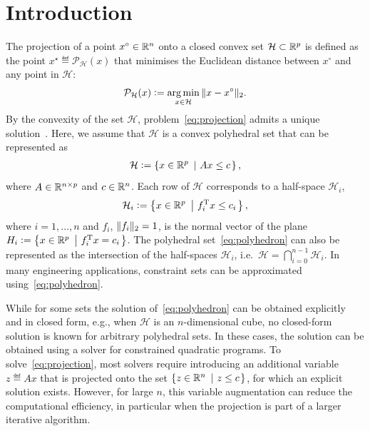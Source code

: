 \documentclass[hidelinks]{article}
\begin{document}
\newpage

\maketitle
\section{Introduction}

The projection of a point $x^\circ\in\mathbb{R}^n$ onto a closed convex set $\mathcal{H}\subset \mathbb{R}^p$ is defined as the point $x^\star\eqdef \mathcal{P}_{\mathcal{H}}(x)$ that minimises the Euclidean distance between $x^\circ$ and any point in $\mathcal{H}$:
\begin{align}\label{eq:projection}
\mathcal{P}_{\mathcal{H}}(x)\vcentcolon= \operatorname*{arg\,min}_{x\in\mathcal{H}}\Vert x-x^\circ \Vert_2.
\end{align}
By the convexity of the set $\mathcal{H}$, problem~\eqref{eq:projection} admits a unique solution~\cite[Ch.\ 3.2]{BAUSCHKEBOOK}. Here, we assume that $\mathcal{H}$ is a convex polyhedral set that can be represented as
\begin{align}\label{eq:polyhedron}
\mathcal{H}\vcentcolon=\left\{ x\in\mathbb{R}^p\ \left| \ A x \leq c \right. \right\},
\end{align}
where $A \in \mathbb{R}^{{n}\times{p}}$ and $c\in\mathbb{R}^n$. Each row of $\mathcal{H}$ corresponds to a half-space $\mathcal{H}_i$,
\begin{align}\label{eq:sets_i}
\mathcal{H}_i\vcentcolon=\left\{ x\in\mathbb{R}^p\ \left| \ f_i^{\text{T}}x \leq c_i \right. \right\},
\end{align}
where $i=1,\dots,n$ and $f_i$, $\Vert f_i \Vert_2=1$, is the normal vector of the plane $H_i\vcentcolon=\left\{ x\in\mathbb{R}^p\ \left| \ f_i^{\text{T}}x = c_i \right. \right\}$. The polyhedral set~\eqref{eq:polyhedron} can also be represented as the intersection of the half-spaces $\mathcal{H}_i$, i.e.\ $\mathcal{H}=\bigcap_{i=0}^{n-1}\mathcal{H}_i$. In many engineering applications, constraint sets can be approximated using~\eqref{eq:polyhedron}.

While for some sets the solution of~\eqref{eq:polyhedron} can be obtained explicitly and in closed form, e.g., when $\mathcal{H}$ is an $n$-dimensional cube, no closed-form solution is known for arbitrary polyhedral sets. In these cases, the solution can be obtained using a solver for constrained quadratic programs. To solve~\eqref{eq:projection}, most solvers require introducing an additional variable $z\eqdef Ax$ that is projected onto the set $\left\{ z\in\mathbb{R}^n\ \left| \ z \leq c \right. \right\}$, for which an explicit solution exists. However, for large $n$, this variable augmentation can reduce the computational efficiency, in particular when the projection is part of a larger iterative algorithm.
\end{document}
